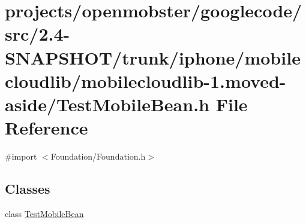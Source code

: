 \hypertarget{mobilecloudlib-1_8moved-aside_2_test_mobile_bean_8h}{
\section{projects/openmobster/googlecode/src/2.4-\/\-S\-N\-A\-P\-S\-H\-O\-T/trunk/iphone/mobilecloudlib/mobilecloudlib-\/1.moved-\/aside/\-Test\-Mobile\-Bean.h \-File \-Reference}
\label{mobilecloudlib-1_8moved-aside_2_test_mobile_bean_8h}
}
{\ttfamily \#import $<$\-Foundation/\-Foundation.\-h$>$}\*
\subsection*{\-Classes}
\begin{DoxyCompactItemize}
\item 
class \hyperlink{interface_test_mobile_bean}{\-Test\-Mobile\-Bean}
\end{DoxyCompactItemize}
